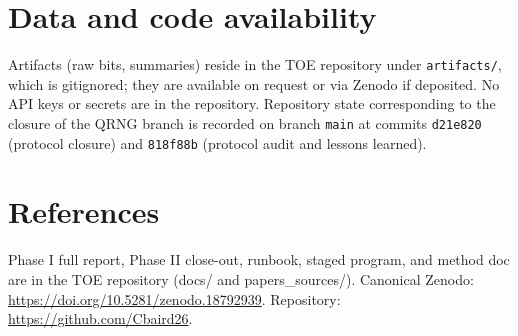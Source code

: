 \documentclass[reprint,amsmath,amssymb,aps,showkeys]{revtex4-2}
\begin{document}
\section{Data and code availability}

Artifacts (raw bits, summaries) reside in the TOE repository under \texttt{artifacts/}, which is gitignored; they are available on request or via Zenodo if deposited. No API keys or secrets are in the repository. Repository state corresponding to the closure of the QRNG branch is recorded on branch \texttt{main} at commits \texttt{d21e820} (protocol closure) and \texttt{818f88b} (protocol audit and lessons learned).

\section*{References}

Phase I full report, Phase II close-out, runbook, staged program, and method doc are in the TOE repository (docs/ and papers\_sources/). Canonical Zenodo: \url{https://doi.org/10.5281/zenodo.18792939}. Repository: \url{https://github.com/Cbaird26}.
\end{document}
